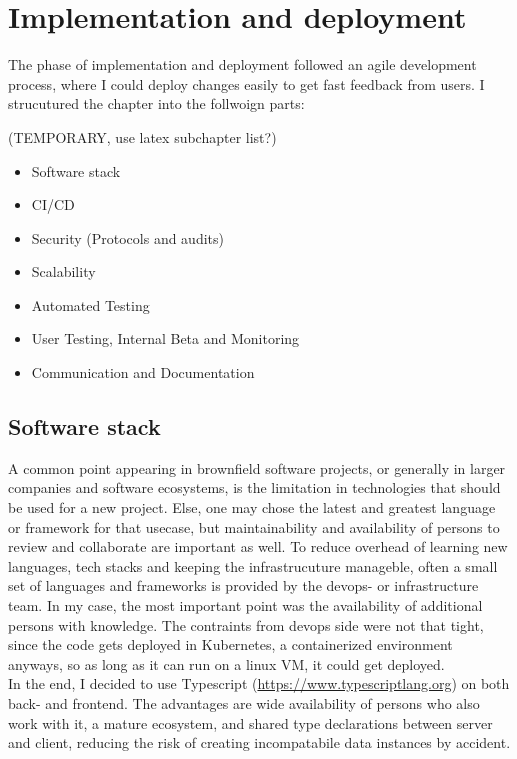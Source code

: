 
%
\section{Implementation and deployment}
\label{chap:chapters} 

The phase of implementation and deployment followed an agile development process, where I could deploy changes easily to get fast feedback from users.
I strucutured the chapter into the follwoign parts:

(TEMPORARY, use latex subchapter list?)
\begin{itemize}
  \item Software stack
  \item CI/CD
  \item Security (Protocols and audits)
  \item Scalability
  \item Automated Testing
  \item User Testing, Internal Beta and Monitoring
  \item Communication and Documentation
\end{itemize}

\subsection{Software stack}

A common point appearing in brownfield software projects, or generally in larger companies and software ecosystems, is the limitation in technologies that should be used for a new project.
Else, one may chose the latest and greatest language or framework for that usecase, but maintainability and availability of persons to review and collaborate are important as well.
To reduce overhead of learning new languages, tech stacks and keeping the infrastrucuture manageble, often a small set of languages and frameworks is provided by the
devops- or infrastructure team. In my case, the most important point was the availability of additional persons with knowledge. The contraints from devops side were not that tight,
since the code gets deployed in Kubernetes, a containerized environment anyways, so as long as it can run on a linux VM, it could get deployed.
\\
In the end, I decided to use Typescript (\url{https://www.typescriptlang.org}) on both back- and frontend.
The advantages are wide availability of persons who also work with it, a mature ecosystem, and shared type declarations between server and client,
reducing the risk of creating incompatabile data instances by accident.

